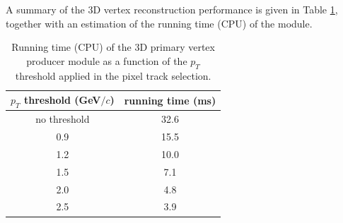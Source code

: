 A summary of the 3D vertex reconstruction performance is given in Table \ref{summary}, together with an estimation of the running time (CPU) of the module. 
\begin{table}[htbp]
\begin{center}
\begin{tabular}{|c|c|}
\hline
$p_{T}$ threshold (GeV$/c$) & running time (ms) \\
\hline
no threshold & 32.6 \\
0.9 & 15.5 \\
1.2 & 10.0 \\
1.5 & 7.1 \\
2.0 & 4.8 \\
2.5 & 3.9 \\
\hline
\end{tabular}
\end{center}
\caption{Running time (CPU) of the 3D primary vertex producer module as a function of the $p_{T}$ threshold applied in the pixel track selection.} 
\label{summary}
\end{table}
